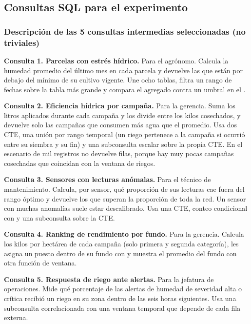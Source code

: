 \subsection{Consultas SQL para el experimento}
\label{sec:consultas}

\subsubsection{Descripción de las 5 consultas intermedias seleccionadas (no triviales)}

\textbf{Consulta 1. Parcelas con estrés hídrico.} Para el agrónomo. Calcula la humedad promedio del último mes en cada parcela y devuelve las que están por debajo del mínimo de su cultivo vigente. Une ocho tablas, filtra un rango de fechas sobre la tabla más grande y compara el agregado contra un umbral en el .

\textbf{Consulta 2. Eficiencia hídrica por campaña.} Para la gerencia. Suma los litros aplicados durante cada campaña y los divide entre los kilos cosechados, y devuelve solo las campañas que consumen más agua que el promedio. Usa dos CTE, una unión por rango temporal (un riego pertenece a la campaña si ocurrió entre su siembra y su fin) y una subconsulta escalar sobre la propia CTE. En el escenario de mil registros no devuelve filas, porque hay muy pocas campañas cosechadas que coincidan con la ventana de riegos.

\textbf{Consulta 3. Sensores con lecturas anómalas.} Para el técnico de mantenimiento. Calcula, por sensor, qué proporción de sus lecturas cae fuera del rango óptimo y devuelve los que superan la proporción de toda la red. Un sensor con muchas anomalías suele estar descalibrado. Usa una CTE, conteo condicional con  y una subconsulta sobre la CTE.

\textbf{Consulta 4. Ranking de rendimiento por fundo.} Para la gerencia. Calcula los kilos por hectárea de cada campaña (solo primera y segunda categoría), les asigna un puesto dentro de su fundo con  y muestra el promedio del fundo con otra función de ventana.

\textbf{Consulta 5. Respuesta de riego ante alertas.} Para la jefatura de operaciones. Mide qué porcentaje de las alertas de humedad de severidad alta o crítica recibió un riego en su zona dentro de las seis horas siguientes. Usa una subconsulta correlacionada  con una ventana temporal que depende de cada fila externa.

